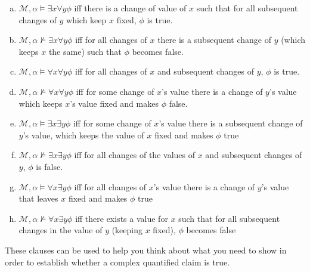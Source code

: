 \begin{enumerate}[\thesection.1]
		\begin{enumerate}[(a)]
		
		  \item $\mathcal{M},\alpha\vDash \exists x\forall y \phi$
			iff there is a change of value of $x$ such that for all subsequent changes of $y$ which keep $x$ fixed, $\phi$ is true.
		
		  \item $\mathcal{M},\alpha\nvDash \exists x\forall y\phi$
			iff for all changes of $x$ there is a subsequent change of $y$ (which keeps $x$ the same) such that $\phi$ becomes false.
		
		  \item $\mathcal{M},\alpha\vDash \forall x\forall y\phi$
			iff for all changes of $x$ and subsequent changes of $y$, $\phi$ is true.
		
		  \item $\mathcal{M},\alpha\nvDash \forall x\forall y\phi$
			iff for some change of $x$'s value there is a change of $y$'s value which keeps $x$'s value fixed and makes $\phi$ false.
		
		  \item $\mathcal{M},\alpha\vDash \exists x\exists y\phi$
			iff for some change of $x$'s value there is a subsequent change of $y$'s value, which keeps the value of $x$ fixed and makes $\phi$ true
		
		  \item $\mathcal{M},\alpha\nvDash \exists x\exists y\phi$
			iff for all changes of the values of $x$ and subsequent changes of $y$, $\phi$ is false.


		  \item $\mathcal{M},\alpha\vDash \forall x \exists y\phi$ iff for all changes of $x$'s value there is a change of $y$'s value that leaves $x$ fixed and makes $\phi$ true

		  \item $\mathcal{M},\alpha\nvDash \forall x \exists y\phi$ iff there exists a value for $x$ such that for all subsequent changes in the value of $y$ (keeping $x$ fixed), $\phi$ becomes false

		\end{enumerate}	
		
		These clauses can be used to help you think about what you need to show in order to establish whether a complex quantified claim is true.
		

\end{enumerate}
